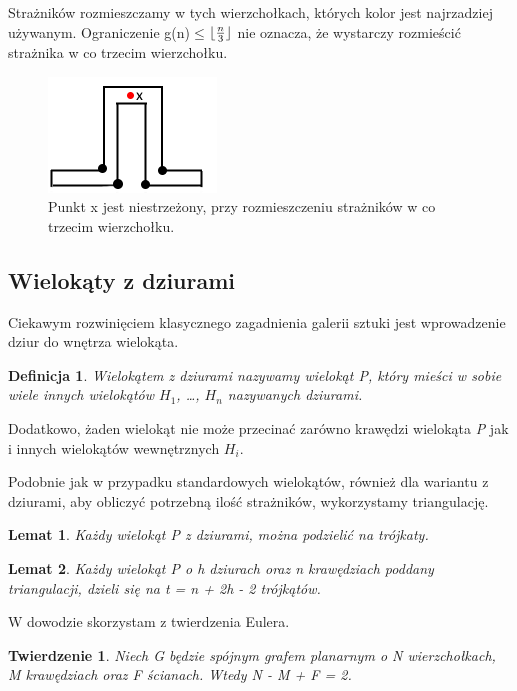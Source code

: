 \documentclass[brudnopis]{xmgr}
\DeclarePairedDelimiter\floor{\lfloor}{\rfloor}
\newtheorem{Twierdzenie}{Twierdzenie}
\newtheorem{Lemat}{Lemat}
\newtheorem{Definicja}{Definicja}
\begin{document}
Strażników rozmieszczamy w tych wierzchołkach, których kolor jest najrzadziej używanym.
\newpage\indent Ograniczenie g(n)$\le$$\floor{\frac{n}{3}}$ nie oznacza, że wystarczy rozmieścić strażnika w co trzecim wierzchołku. 
\begin{figure}[ht!]
  \centering
  \includegraphics{rysunki/co_trzeci.png}
  \caption{Punkt x jest niestrzeżony, przy rozmieszczeniu strażników w co trzecim wierzchołku.}
\end{figure} 

\subsection{Wielokąty z dziurami}
Ciekawym rozwinięciem klasycznego zagadnienia galerii sztuki jest wprowadzenie dziur do wnętrza wielokąta.

\begin{Definicja}\label{def wielokat z dziurami}
  \textnormal{Wielokątem z dziurami} nazywamy wielokąt P, który mieści w sobie wiele innych wielokątów $H_1$, \ldots, $H_n$ nazywanych dziurami.
\end{Definicja}
Dodatkowo, żaden wielokąt nie może przecinać zarówno krawędzi wielokąta \textit{P} jak i innych wielokątów wewnętrznych $H_i$.

\indent Podobnie jak w przypadku standardowych wielokątów, również dla wariantu z dziurami, aby obliczyć potrzebną ilość strażników, wykorzystamy triangulację.

\begin{Lemat}
  Każdy wielokąt P z dziurami, można podzielić na trójkaty.
\end{Lemat}

\begin{Lemat}\label{t trójkątów triangulacja}
  Każdy wielokąt P o \textnormal{h} dziurach oraz \textnormal{n} krawędziach poddany triangulacji, dzieli się na \textit{t = n + 2h - 2} trójkątów.
\end{Lemat}

W dowodzie skorzystam z twierdzenia Eulera.
\begin{Twierdzenie}\label{tw eulera}
  Niech G będzie spójnym grafem planarnym o N wierzchołkach, M krawędziach oraz F ścianach. Wtedy N - M + F = 2.
\end{Twierdzenie}
\end{document}
